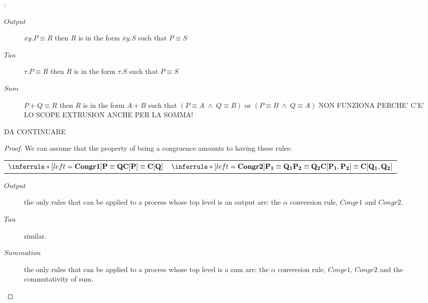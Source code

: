 \begin{lemma}\label{inversionlemmamultiinplatewhith}
  :\begin{description}
    \item[$Output$]
      $\overline{x}y.P \equiv R$ then $R$ is in the form $\overline{x}y.S$ such that $P\equiv S$
    \item[$Tau$]
      $\tau.P \equiv R$ then $R$ is in the form $\tau.S$ such that $P\equiv S$
    \item[$Sum$]
      $P+Q \equiv R$ then $R$ is in the form $A+B$ such that $(P\equiv A\; \wedge\; Q\equiv B)$ or $(P\equiv B\; \wedge\; Q\equiv A)$ NON FUNZIONA PERCHE' C'E' LO SCOPE EXTRUSION ANCHE PER LA SOMMA!
  \end{description}
  DA CONTINUARE
  \begin{proof}
  We can assume that the property of being a congruence amounts to having these rules:
  \begin{center}
    \begin{tabular}{ll}
	$\inferrule* [left=\bf{Congr1}]{
	  P\equiv Q
	}{
	  C[P]\equiv C[Q]
	}$
      &
	$\inferrule* [left=\bf{Congr2}]{
	    P_{1}\equiv Q_{1}
	  \\
	    P_{2}\equiv Q_{2}
	}{
	  C[P_{1}, P_{2}]\equiv C[Q_{1}, Q_{2}]
	}$
    \end{tabular}
  \end{center}
  \begin{description}
    \item[$Output$] the only rules that can be applied to a process whose top level is an output are: the $\alpha$ conversion rule, $Congr1$ and $Congr2$.
    \item[$Tau$] similar.
    \item[$Summation$] the only rules that can be applied to a process whose top level is a sum are: the $\alpha$ conversion rule, $Congr1$, $Congr2$ and the commutativity of sum.

  \end{description}
  \end{proof}
\end{lemma}


